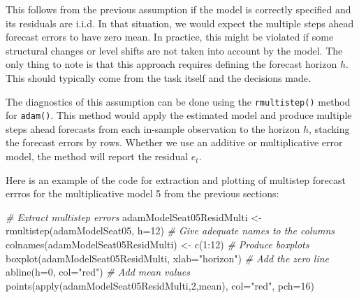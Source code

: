 \documentclass[
]{book}
\newenvironment{Shaded}{\begin{snugshade}}{\end{snugshade}}
\newcommand{\AttributeTok}[1]{\textcolor[rgb]{0.77,0.63,0.00}{#1}}
\newcommand{\CommentTok}[1]{\textcolor[rgb]{0.56,0.35,0.01}{\textit{#1}}}
\newcommand{\DecValTok}[1]{\textcolor[rgb]{0.00,0.00,0.81}{#1}}
\newcommand{\FunctionTok}[1]{\textcolor[rgb]{0.00,0.00,0.00}{#1}}
\newcommand{\NormalTok}[1]{#1}
\newcommand{\OtherTok}[1]{\textcolor[rgb]{0.56,0.35,0.01}{#1}}
\newcommand{\SpecialCharTok}[1]{\textcolor[rgb]{0.00,0.00,0.00}{#1}}
\newcommand{\StringTok}[1]{\textcolor[rgb]{0.31,0.60,0.02}{#1}}
\theoremstyle{definition}
\theoremstyle{definition}
\theoremstyle{definition}
\theoremstyle{definition}
\theoremstyle{remark}
\begin{document}
This follows from the previous assumption if the model is correctly specified and its residuals are i.i.d. In that situation, we would expect the multiple steps ahead forecast errors to have zero mean. In practice, this might be violated if some structural changes or level shifts are not taken into account by the model. The only thing to note is that this approach requires defining the forecast horizon \(h\). This should typically come from the task itself and the decisions made.

The diagnostics of this assumption can be done using the \texttt{rmultistep()} method for \texttt{adam()}. This method would apply the estimated model and produce multiple steps ahead forecasts from each in-sample observation to the horizon \(h\), stacking the forecast errors by rows. Whether we use an additive or multiplicative error model, the method will report the residual \(e_t\).

Here is an example of the code for extraction and plotting of multistep forecast errros for the multiplicative model 5 from the previous sections:

\begin{Shaded}
\begin{Highlighting}[]
\CommentTok{\# Extract multistep errors}
\NormalTok{adamModelSeat05ResidMulti }\OtherTok{\textless{}{-}} \FunctionTok{rmultistep}\NormalTok{(adamModelSeat05, }\AttributeTok{h=}\DecValTok{12}\NormalTok{)}
\CommentTok{\# Give adequate names to the columns}
\FunctionTok{colnames}\NormalTok{(adamModelSeat05ResidMulti) }\OtherTok{\textless{}{-}} \FunctionTok{c}\NormalTok{(}\DecValTok{1}\SpecialCharTok{:}\DecValTok{12}\NormalTok{)}
\CommentTok{\# Produce boxplots}
\FunctionTok{boxplot}\NormalTok{(adamModelSeat05ResidMulti, }\AttributeTok{xlab=}\StringTok{"horizon"}\NormalTok{)}
\CommentTok{\# Add the zero line}
\FunctionTok{abline}\NormalTok{(}\AttributeTok{h=}\DecValTok{0}\NormalTok{, }\AttributeTok{col=}\StringTok{"red"}\NormalTok{)}
\CommentTok{\# Add mean values}
\FunctionTok{points}\NormalTok{(}\FunctionTok{apply}\NormalTok{(adamModelSeat05ResidMulti,}\DecValTok{2}\NormalTok{,mean), }\AttributeTok{col=}\StringTok{"red"}\NormalTok{, }\AttributeTok{pch=}\DecValTok{16}\NormalTok{)}
\end{Highlighting}
\end{Shaded}
\end{document}
